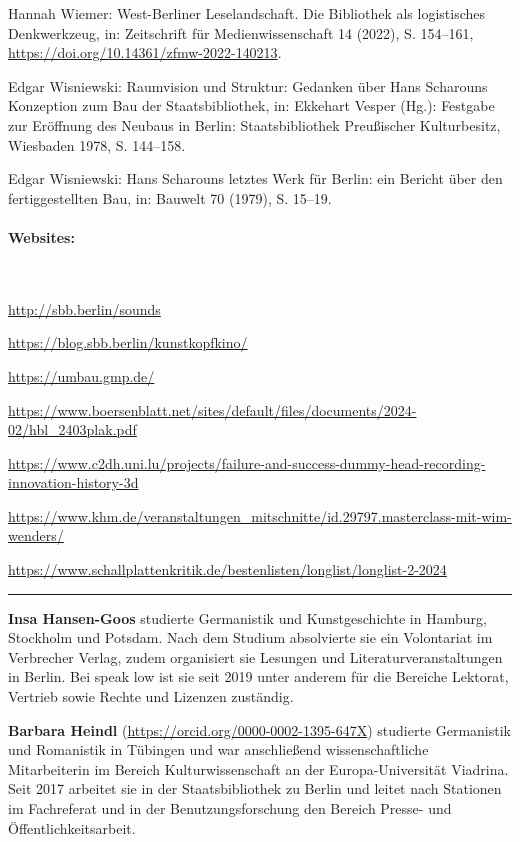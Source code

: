 \documentclass[a4paper,
fontsize=11pt,
oneside,
numbers=noperiodatend,
parskip=half-,
bibliography=totoc,
final
]{scrartcl}
\begin{document}
Hannah Wiemer: West-Berliner Leselandschaft. Die Bibliothek als
logistisches Denkwerkzeug, in: Zeitschrift für Medienwissenschaft 14
(2022), S. 154--161, \url{https://doi.org/10.14361/zfmw-2022-140213}.

Edgar Wisniewski: Raumvision und Struktur: Gedanken über Hans
Scharouns Konzeption zum Bau der Staatsbibliothek, in: Ekkehart Vesper
(Hg.): Festgabe zur Eröffnung des Neubaus in Berlin: Staatsbibliothek
Preußischer Kulturbesitz, Wiesbaden 1978, S. 144--158.

Edgar Wisniewski: Hans Scharouns letztes Werk für Berlin: ein Bericht
über den fertiggestellten Bau, in: Bauwelt 70 (1979), S. 15--19.

\paragraph{Websites: } ~

\url{http://sbb.berlin/sounds}

\url{https://blog.sbb.berlin/kunstkopfkino/}

\url{https://umbau.gmp.de/}

\url{https://www.boersenblatt.net/sites/default/files/documents/2024-02/hbl_2403plak.pdf}

\url{https://www.c2dh.uni.lu/projects/failure-and-success-dummy-head-recording-innovation-history-3d}

\url{https://www.khm.de/veranstaltungen_mitschnitte/id.29797.masterclass-mit-wim-wenders/}

\url{https://www.schallplattenkritik.de/bestenlisten/longlist/longlist-2-2024}


\begin{center}\rule{0.5\linewidth}{0.5pt}\end{center}

\textbf{Insa Hansen-Goos} studierte Germanistik und Kunstgeschichte in
Hamburg, Stockholm und Potsdam. Nach dem Studium absolvierte sie ein
Volontariat im Verbrecher Verlag, zudem organisiert sie Lesungen und
Literaturveranstaltungen in Berlin. Bei speak low ist sie seit 2019
unter anderem für die Bereiche Lektorat, Vertrieb sowie Rechte und
Lizenzen zuständig.

\textbf{Barbara Heindl} (\url{https://orcid.org/0000-0002-1395-647X})
studierte Germanistik und Romanistik in Tübingen und war anschließend
wissenschaftliche Mitarbeiterin im Bereich Kulturwissenschaft an der
Europa-Universität Viadrina. Seit 2017 arbeitet sie in der
Staatsbibliothek zu Berlin und leitet nach Stationen im Fachreferat und
in der Benutzungsforschung den Bereich Presse- und
Öffentlichkeitsarbeit.
\end{document}
